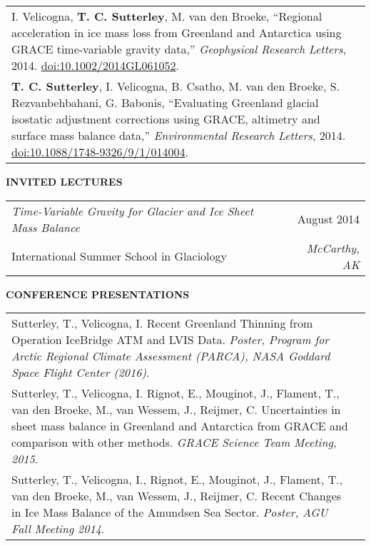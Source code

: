{\begin{tabular*}{1\textwidth}{@{\extracolsep{\fill}}p{6.4in}r}
	I. Velicogna, {\bf T. C. Sutterley},  M. van den Broeke, ``Regional acceleration in ice mass loss from Greenland and Antarctica using GRACE time-variable gravity data,'' {\em Geophysical Research Letters}, 2014. \href{http://dx.doi.org/10.1002/2014GL061052}{doi:10.1002/2014GL061052}.\\
	\vspace{5pt}

	{\bf T. C. Sutterley}, I. Velicogna,  B. Csatho, M. van den Broeke, S. Rezvanbehbahani, G. Babonis, ``Evaluating Greenland glacial isostatic adjustment corrections using GRACE, altimetry and surface mass balance data,'' {\em Environmental Research Letters}, 2014. \href{http://dx.doi.org/10.1088/1748-9326/9/1/014004}{doi:10.1088/1748-9326/9/1/014004}.
	\end{tabular*}

	\vspace{12pt}
	\textbf{INVITED LECTURES}

	\begin{tabular*}{1\textwidth}{@{\extracolsep{\fill}}lr}
		\emph{Time-Variable Gravity for Glacier and Ice Sheet Mass Balance} & August 2014\\
		\vspace{6pt}International Summer School in Glaciology & \emph{McCarthy, AK}\\
	\end{tabular*}

	\newpage
	\vspace{12pt}
	\textbf{CONFERENCE PRESENTATIONS}

	\begin{tabular*}{1\textwidth}{@{\extracolsep{\fill}}p{6.4in}r}
	Sutterley, T., Velicogna, I.  Recent Greenland Thinning from Operation IceBridge ATM and LVIS Data.  {\em Poster, Program for Arctic Regional Climate Assessment (PARCA), NASA Goddard Space Flight Center (2016)}. \\
	\vspace{5pt}

	Sutterley, T., Velicogna, I.  Rignot, E., Mouginot, J., Flament, T., van den Broeke, M., van Wessem, J., Reijmer, C. Uncertainties in sheet mass balance in Greenland and Antarctica from GRACE and comparison with other methods. {\em GRACE Science Team Meeting, 2015}.\\
 	\vspace{5pt}

	Sutterley, T., Velicogna, I., Rignot, E., Mouginot, J., Flament, T., van den Broeke, M., van Wessem, J., Reijmer, C.  Recent Changes in Ice Mass Balance of the Amundsen Sea Sector.  {\em Poster, AGU Fall Meeting 2014}.

	\end{tabular*}

}


